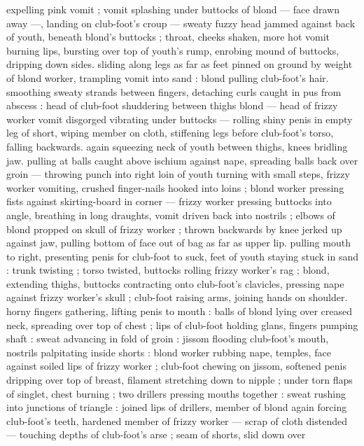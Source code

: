 expelling pink vomit ; vomit splashing under buttocks of blond --- 
face drawn away ---, landing on club-foot's croup --- sweaty fuzzy 
head jammed against back of youth, beneath blond's buttocks ; 
throat, cheeks shaken, more hot vomit burning lips, bursting over top 
of youth's rump, enrobing mound of buttocks, dripping down sides. 
sliding along legs as far as feet pinned on ground by weight of blond 
worker, trampling vomit into sand : blond pulling club-foot's hair. 
smoothing sweaty strands between fingers, detaching curls caught in 
pus from abscess : head of club-foot shuddering between thighs 
blond --- head of frizzy worker vomit disgorged vibrating under 
buttocks --- rolling shiny penis in empty leg of short, wiping member 
on cloth, stiffening legs before club-foot's torso, falling backwards. 
again squeezing neck of youth between thighs, knees bridling jaw. 
pulling at balls caught above ischium against nape, spreading balls 
back over groin --- throwing punch into right loin of youth turning 
with small steps, frizzy worker vomiting, crushed finger-nails hooked 
into loins ; blond worker pressing fists against skirting-board in 
corner --- frizzy worker pressing buttocks into angle, breathing in 
long draughts, vomit driven back into nostrils ; elbows of blond 
propped on skull of frizzy worker ; thrown backwards by knee jerked 
up against jaw, pulling bottom of face out of bag as far as upper lip. 
pulling mouth to right, presenting penis for club-foot to suck, feet of 
youth staying stuck in sand : trunk twisting ; torso twisted, buttocks 
rolling frizzy worker's rag ; blond, extending thighs, buttocks 
contracting onto club-foot's clavicles, pressing nape against frizzy 
worker's skull ; club-foot raising arms, joining hands on shoulder. 
horny fingers gathering, lifting penis to mouth : balls of blond lying 
over creased neck, spreading over top of chest ; lips of club-foot 
holding glans, fingers pumping shaft : sweat advancing in fold of 
groin : jissom flooding club-foot's mouth, nostrils palpitating inside 
shorts : blond worker rubbing nape, temples, face against soiled lips 
of frizzy worker ; club-foot chewing on jissom, softened penis 
dripping over top of breast, filament stretching down to nipple ; 
under torn flaps of singlet, chest burning ; two drillers pressing 
mouths together : sweat rushing into junctions of triangle : joined 
lips of drillers, member of blond again forcing club-foot's teeth, 
hardened member of frizzy worker --- scrap of cloth distended --- 
touching depths of club-foot's arse ; seam of shorts, slid down over 

